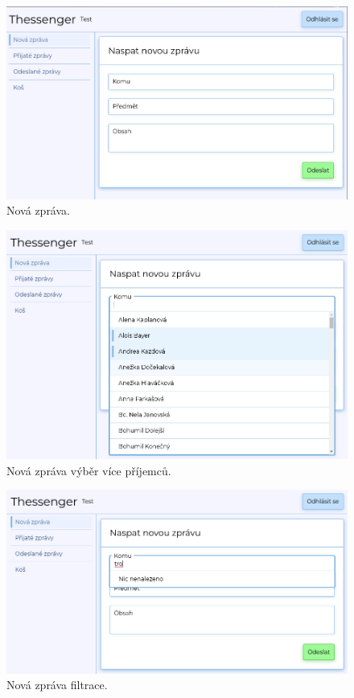 \documentclass[
  master,
  program=ainf,
  tables=false,
  sourcecodes,
  glossaries,
  index
]{kidiplom}
\begin{document}
\begin{figure}[H]
  \centering
  \includegraphics[width=\textwidth]{graphics/thessenger_new_message.png}
  \caption{Nová zpráva.}
  \label{fig:new_message}
\end{figure}

\begin{figure}[H]
  \centering
  \includegraphics[width=\textwidth]{graphics/thessenger_new_message_multi_select.png}
  \caption{Nová zpráva výběr více příjemců.}
  \label{fig:new_message_multiselect}
\end{figure}

\begin{figure}[H]
  \centering
  \includegraphics[width=\textwidth]{graphics/thessenger_new_message_nothing_found.png}
  \caption{Nová zpráva filtrace.}
  \label{fig:new_message_filtration}
\end{figure}
\end{document}
